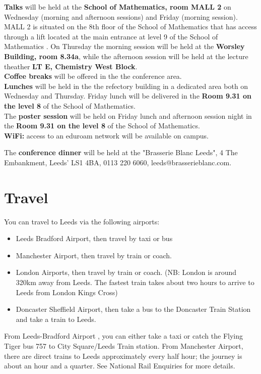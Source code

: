 \textbf{Talks} will be held at the \textbf{School of Mathematics, room MALL 2} on  Wednesday (morning and afternoon sessions) and Friday (morning session). MALL 2 is situated on the 8th floor of the School of Mathematics that has access through a lift located at the main entrance at level 9 of the School of Mathematics . 
On Thursday the morning session will be held at the \textbf{Worsley Building, room 8.34a}, while the afternoon session will be held at the lecture theather \textbf{ LT E, Chemistry West Block}.\\
\textbf{Coffee breaks} will be offered in the the conference area.\\
\textbf{Lunches} will be held in the the refectory building in a dedicated area both on Wednesday and Thursday. Friday lunch will be delivered  in the \textbf{Room 9.31 on the level 8} of the School of Mathematics.\\

The \textbf{poster session} will be held on Friday lunch and afternoon session night in the \textbf{Room 9.31 on the level 8} of the School of Mathematics. \\

\textbf{WiFi:} access to an eduroam network will be available on campus.

The \textbf{conference dinner} will be held at the "Brasserie Blanc Leeds",
4 The Embankment,
Leeds'
LS1 4BA,
0113 220 6060,
leeds@brasserieblanc.com.

\section{Travel}
You can travel to Leeds via the following airports:
\begin{itemize}
\item Leeds Bradford Airport, then travel by taxi or bus
\item Manchester Airport, then travel by train or coach.
\item London Airports, then travel by train or coach. (NB: London is around 320km away from Leeds. The fastest train takes about two hours to arrive to Leeds from London Kings Cross)
\item Doncaster Sheffield Airport, then take a bus to the Doncaster Train Station and take a train to Leeds.
\end{itemize}
From Leeds-Bradford Airport , you can either take a taxi or catch the Flying Tiger bus 757 to City Square/Leeds Train station. From Manchester Airport, there are direct trains to Leeds approximately every half hour; the journey is about an hour and a quarter. See National Rail Enquiries for more details.

